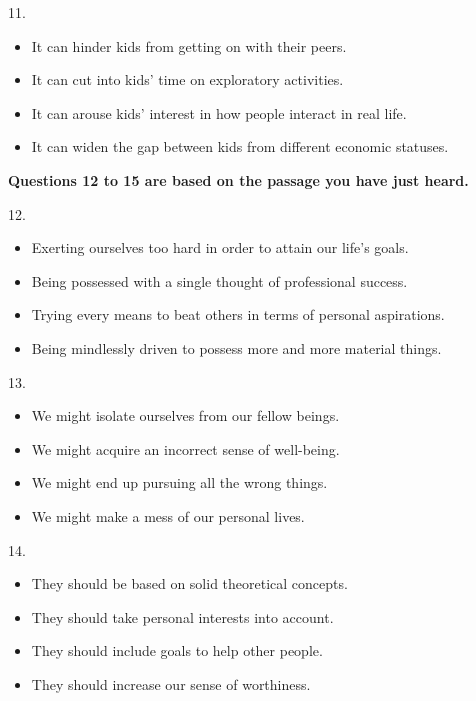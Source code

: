 \documentclass[UTF8,11pt]{ctexart}
\begin{document}
11.


\begin{itemize}[leftmargin=2em,itemsep=.2em,topsep=.4em]\item[A.] It can hinder kids from getting on with their peers.
\item[B.] It can cut into kids’ time on exploratory activities.
\item[C.] It can arouse kids’ interest in how people interact in real life.
\item[D.] It can widen the gap between kids from different economic statuses.
\end{itemize}

\textbf{Questions 12 to 15 are based on the passage you have just heard.}


12.


\begin{itemize}[leftmargin=2em,itemsep=.2em,topsep=.4em]\item[A.] Exerting ourselves too hard in order to attain our life’s goals.
\item[B.] Being possessed with a single thought of professional success.
\item[C.] Trying every means to beat others in terms of personal aspirations.
\item[D.] Being mindlessly driven to possess more and more material things.
\end{itemize}

13.


\begin{itemize}[leftmargin=2em,itemsep=.2em,topsep=.4em]\item[A.] We might isolate ourselves from our fellow beings.
\item[B.] We might acquire an incorrect sense of well-being.
\item[C.] We might end up pursuing all the wrong things.
\item[D.] We might make a mess of our personal lives.
\end{itemize}

14.


\begin{itemize}[leftmargin=2em,itemsep=.2em,topsep=.4em]\item[A.] They should be based on solid theoretical concepts.
\item[B.] They should take personal interests into account.
\item[C.] They should include goals to help other people.
\item[D.] They should increase our sense of worthiness.
\end{itemize}
\end{document}
